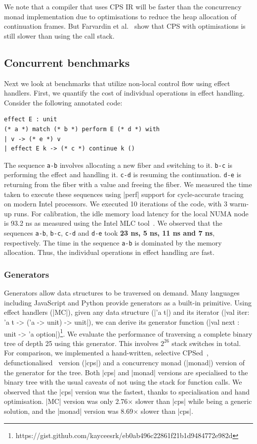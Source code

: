 \documentclass[sigplan,screen]{acmart}
\begin{document}
We note that a compiler that uses CPS IR will be faster than the concurrency
monad implementation due to optimisations to reduce the heap allocation of
continuation frames. But Farvardin et al.~\cite{Farvardin20} show that CPS with
optimisations is still slower than using the call stack.

\subsection{Concurrent benchmarks}

Next we look at benchmarks that utilize non-local control flow using effect
handlers. First, we quantify the cost of individual operations in effect
handling. Consider the following annotated code:
\begin{lstlisting}
effect E : unit
(* a *) match (* b *) perform E (* d *) with
| v -> (* e *) v
| effect E k -> (* c *) continue k ()
\end{lstlisting}
The sequence \texttt{a-b} involves allocating a new fiber and switching to it.
\texttt{b-c} is performing the effect and handling it. \texttt{c-d} is resuming
the continuation. \texttt{d-e} is returning from the fiber with a value and
freeing the fiber. We measured the time taken to execute these sequences using
|perf| support for cycle-accurate tracing on modern Intel processors. We
executed 10 iterations of the code, with 3 warm-up runs. For calibration, the
idle memory load latency for the local NUMA node is 93.2 ns as measured using
the Intel MLC tool~\cite{mlc}. We observed that the sequences \texttt{a-b},
\texttt{b-c}, \texttt{c-d} and \texttt{d-e} took \textbf{23 ns, 5 ns, 11 ns and
7 ns}, respectively. The time in the sequence \texttt{a-b} is dominated by the
memory allocation. Thus, the individual operations in effect handling are fast.

\subsubsection{Generators}

Generators allow data structures to be traversed on demand. Many languages
including JavaScript and Python provide generators as a built-in primitive.
Using effect handlers (|MC|), given any data structure (|'a t|) and its
iterator (|val iter: 'a t -> ('a -> unit) -> unit|), we can derive its
generator function (|val next : unit -> 'a option|)\footnote{https://gist.github.com/kayceesrk/eb0ab496c22861f21b1d9484772e982d}.
We evaluate the performance of traversing a complete binary tree of depth 25
using this generator. This involves $2^{26}$ stack switches in total. For
comparison, we implemented a hand-written, selective CPSed~\cite{Nielson01},
defunctionalised~\cite{Danvy01} version (|cps|) and a concurrency monad
(|monad|) version of the generator for the tree. Both |cps| and |monad|
versions are specialised to the binary tree with the usual caveats of not using
the stack for function calls. We observed that the |cps| version was the
fastest, thanks to specialisation and hand optimisation. |MC| version was only
2.76$\times$ slower than |cps| while being a generic solution, and the |monad|
version was 8.69$\times$ slower than |cps|.
\end{document}
